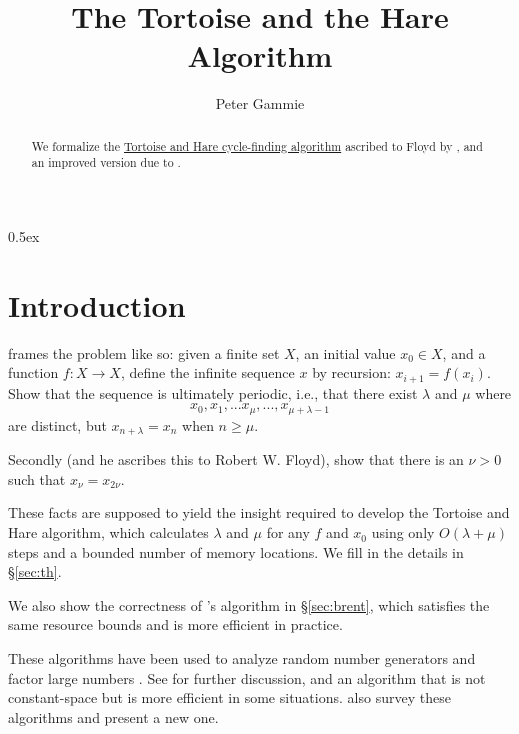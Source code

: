 \documentclass[11pt,a4paper]{article}
\begin{document}
\parindent 0pt\parskip 0.5ex

\title{The Tortoise and the Hare Algorithm}
\author{Peter Gammie}
\maketitle

\begin{abstract}
  We formalize the
  \href{http://en.wikipedia.org/wiki/Cycle_detection}{Tortoise and
    Hare cycle-finding algorithm} ascribed to Floyd by \citet[p7,
  exercise 6]{DBLP:books/aw/Knuth81}, and an improved version due to
  \citet{Brent:1980}.
\end{abstract}

\tableofcontents

\section{Introduction}

\citet[p7, exercise 6]{DBLP:books/aw/Knuth81} frames the problem like
so: given a finite set $X$, an initial value $x_0 \in X$, and a
function $f : X \rightarrow X$, define the infinite sequence $x$ by
recursion: $x_{i+1} = f(x_i)$. Show that the sequence is ultimately
periodic, i.e., that there exist $\lambda$ and $\mu$ where
$$x_0, x_1, ... x_\mu, ..., x_{\mu + \lambda - 1}$$ are distinct, but
$x_{n+\lambda} = x_n$ when $n \ge \mu$.


Secondly (and he ascribes this to Robert W. Floyd), show that there is
an $\nu > 0$ such that $x_\nu = x_{2\nu}$.


These facts are supposed to yield the insight required to develop the
Tortoise and Hare algorithm, which calculates $\lambda$ and $\mu$ for
any $f$ and $x_0$ using only $O(\lambda + \mu)$ steps and a bounded
number of memory locations. We fill in the details in \S\ref{sec:th}.

We also show the correctness of \citet{Brent:1980}'s algorithm in
\S\ref{sec:brent}, which satisfies the same resource bounds and is
more efficient in practice.

These algorithms have been used to analyze random number generators
\citep[op. cit.]{DBLP:books/aw/Knuth81} and factor large numbers
\citep{Brent:1980}. See \citet{DBLP:journals/ipl/Nivasch04} for
further discussion, and an algorithm that is not constant-space but is
more efficient in some situations. \citet{DBLP:journals/jam/WangZ12}
also survey these algorithms and present a new one.
\end{document}
